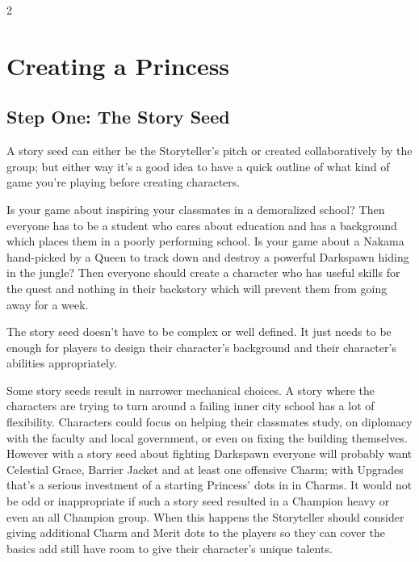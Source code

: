\label{cha:Coronations}

\begin{multicols}{2}\raggedcolumns

\section*{Creating a Princess} 
\label{sec:CreatingAPrincess}

\subsection*{Step One: The Story Seed} 

A story seed can either be the Storyteller's pitch or created collaboratively by the group; but either way it's a good idea to have a quick outline of what kind of game you're playing before creating characters. 

Is your game about inspiring your classmates in a demoralized school? Then everyone has to be a student who cares about education and has a background which places them in a poorly performing school. Is your game about a Nakama hand-picked by a Queen to track down and destroy a powerful Darkspawn hiding in the jungle? Then everyone should create a character who has useful skills for the quest and nothing in their backstory which will prevent them from going away for a week.

The story seed doesn't have to be complex or well defined. It just needs to be enough for players to design their character's background and their character's abilities appropriately. 

Some story seeds result in narrower mechanical choices. A story where the characters are trying to turn around a failing inner city school has a lot of flexibility. Characters could focus on helping their classmates study, on diplomacy with the faculty and local government, or even on fixing the building themselves. However with a story seed about fighting Darkspawn everyone will probably want Celestial Grace, Barrier Jacket and at least one offensive Charm; with Upgrades that's a serious investment of a starting Princess'  dots in in Charms. It would not be odd or inappropriate if such a story seed resulted in a Champion heavy or even an all Champion group. When this happens the Storyteller should consider giving additional Charm and Merit dots to the players so they can cover the basics add still have room to give their character's unique talents.  


\end{multicols}
